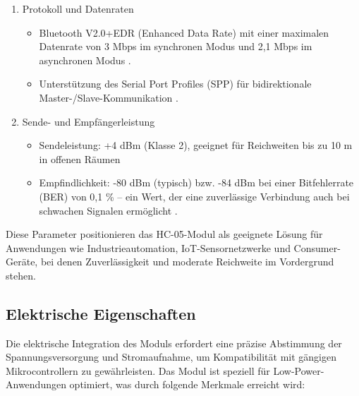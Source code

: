 \begin{enumerate}
	\item Protokoll und Datenraten
		\begin{itemize}
			\item Bluetooth V2.0+EDR (Enhanced Data Rate) mit einer maximalen Datenrate von 3 Mbps im synchronen Modus und 2,1 Mbps im asynchronen Modus \cite{ReicheltHC05:2025}\cite{HC05Datasheet:2010}.
			\item Unterstützung des Serial Port Profiles (SPP) für bidirektionale Master-/Slave-Kommunikation \cite{ReicheltHC05:2025}.
		\end{itemize}
	\item Sende- und Empfängerleistung 
		\begin{itemize} 
			\item Sendeleistung: +4 dBm (Klasse 2), geeignet für Reichweiten bis zu 10 m in offenen Räumen \cite{HC05Datasheet:2010}
			\item Empfindlichkeit: -80 dBm (typisch) bzw. -84 dBm bei einer Bitfehlerrate (BER) von 0,1 \% – ein Wert, der eine zuverlässige Verbindung auch bei schwachen Signalen ermöglicht \cite{HC05Datasheet:2010}\cite{ReicheltHC05:2025}.
		\end{itemize}
\end{enumerate}
	
Diese Parameter positionieren das HC-05-Modul als geeignete Lösung für Anwendungen wie Industrieautomation, IoT-Sensornetzwerke und Consumer-Geräte, bei denen Zuverlässigkeit und moderate Reichweite im Vordergrund stehen.



\subsection{Elektrische Eigenschaften}

Die elektrische Integration des Moduls erfordert eine präzise Abstimmung der Spannungsversorgung und Stromaufnahme, um Kompatibilität mit gängigen Mikrocontrollern zu gewährleisten. Das Modul ist speziell für Low-Power-Anwendungen optimiert, was durch folgende Merkmale erreicht wird:

